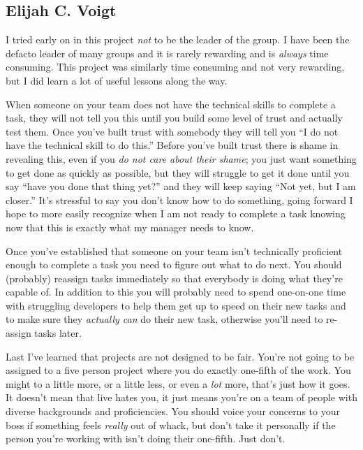 
\subsection{Elijah C. Voigt}

I tried early on in this project \textit{not} to be the leader of the group.
I have been the defacto leader of many groups and it is rarely rewarding and is \textit{always} time consuming.
This project was similarly time consuming and not very rewarding, but I did learn a lot of useful lessons along the way.

When someone on your team does not have the technical skills to complete a task, they will not tell you this until you build some level of trust and actually test them.
Once you've built trust with somebody they will tell you ``I do not have the technical skill to do this.''
Before you've built trust there is shame in revealing this, even if you \textit{do not care about their shame}; you just want something to get done as quickly as possible, but they will struggle to get it done until you say ``have you done that thing yet?'' and they will keep saying ``Not yet, but I am closer.''
It's stressful to say you don't know how to do something, going forward I hope to more easily recognize when I am not ready to complete a task knowing now that this is exactly what my manager needs to know.

Once you've established that someone on your team isn't technically proficient enough to complete a task you need to figure out what to do next.
You should (probably) reassign tasks immediately so that everybody is doing what they're capable of.
In addition to this you will probably need to spend one-on-one time with struggling developers to help them get up to speed on their new tasks and to make sure they \textit{actually can} do their new task, otherwise you'll need to re-assign tasks later.

Last I've learned that projects are not designed to be fair.
You're not going to be assigned to a five person project where you do exactly one-fifth of the work.
You might to a little more, or a little less, or even a \textit{lot} more, that's just how it goes.
It doesn't mean that live hates you, it just means you're on a team of people with diverse backgrounds and proficiencies.
You should voice your concerns to your boss if something feels \textit{really} out of whack, but don't take it personally if the person you're working with isn't doing their one-fifth.
Just don't.

